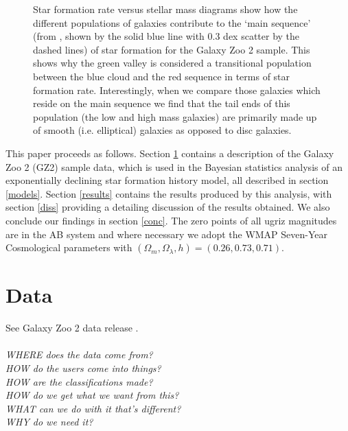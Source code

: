 \documentclass{mn2e}
\begin{document}
\begin{figure}
\caption{Star formation rate versus stellar mass diagrams show how the different populations of galaxies contribute to the `main sequence' (from \citet{Peng}, shown by the solid blue line with 0.3 dex scatter by the dashed lines) of star formation for the Galaxy Zoo 2 sample. This shows why the green valley is considered a transitional population between the blue cloud and the red sequence in terms of star formation rate. Interestingly, when we compare those galaxies which reside on the main sequence we find that the tail ends of this population (the low and high mass galaxies) are primarily made up of smooth (i.e. elliptical) galaxies as opposed to disc galaxies.}
\label{sfr_mass}
\end{figure}

This paper proceeds as follows. Section \ref{data} contains a description of the Galaxy Zoo 2 (GZ2) sample data, which is used in the Bayesian statistics analysis of an exponentially declining star formation history model, all described in section \ref{models}. Section \ref{results} contains the results produced by this analysis, with section \ref{diss} providing a detailing discussion of the results obtained. We also conclude our findings in section \ref{conc}. The zero points of all ugriz magnitudes are in the AB system and where necessary we adopt the WMAP Seven-Year Cosmological parameters \citep{WMAP} with $(\Omega_m, \Omega_{\lambda}, h) = (0.26, 0.73, 0.71)$. 

\section{Data}\label{data}
See Galaxy Zoo 2 data release \cite{GZ2}.
\\
\\
\emph{WHERE does the data come from? \\ HOW do the users come into things? \\ HOW are the classifications made? \\ HOW do we get what we want from this? \\ WHAT can we do with it that's different? \\ WHY do we need it?}
\end{document}
